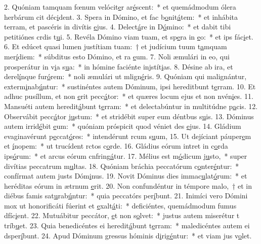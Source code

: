 2. Quóniam tamquam fœnum velócit\uline{e}r ar\uline{é}scent:~* et quemádmodum ólera herbárum cit déc\uline{i}dent.
3. Spera in Dómino, et fac b\uline{o}nit\uline{á}tem:~* et inhábita terram, et pascéris in divítis \uline{e}jus.
4. Delect\uline{á}re in D\uline{ó}mino:~* et dabit tibi petitiónes crdis t\uline{u}i.
5. Revéla Dómino viam tuam, et sp\uline{e}ra in \uline{e}o:~* et ips fác\uline{i}et.
6. Et edúcet quasi lumen justítiam tuam:~† et judícium tuum t\uline{a}mquam mer\uline{í}diem:~* súbditus esto Dómino, et ra \uline{e}um.
7. Noli æmulári in eo, qui prosperátur in v\uline{i}a s\uline{u}a:~* in hómine faciénte injstít\uline{i}as.
8. Désine ab ira, et derel\uline{í}nque fur\uline{ó}rem:~* noli æmulári ut mlign\uline{é}ris.
9. Quóniam qui malignántur, exterm\uline{i}nab\uline{ú}ntur:~* sustinéntes autem Dóminum, ipsi hereditbunt t\uline{e}rram.
10. Et adhuc pusíllum, et non \uline{e}rit pecc\uline{á}tor:~* et quæres locum ejus et non nvén\uline{i}es.
11. Mansuéti autem heredit\uline{á}bunt t\uline{e}rram:~* et delectabúntur in multitúdne p\uline{a}cis.
12. Observábit pecc\uline{á}tor j\uline{u}stum:~* et stridébit super eum déntbus s\uline{u}is.
13. Dóminus autem irrid\uline{é}bit \uline{e}um:~* quóniam próspicit quod véniet des \uline{e}jus.
14. Gládium evaginavérunt p\uline{e}ccat\uline{ó}res:~* intendérunt rcum s\uline{u}um,
15. Ut dejíciant páuper\uline{e}m et \uline{í}nopem:~* ut trucídent rctos c\uline{o}rde.
16. Gládius eórum intret in c\uline{o}rda ips\uline{ó}rum:~* et arcus eórum cnfring\uline{á}tur.
17. Mélius est m\uline{ó}dicum j\uline{u}sto,~* super divítias peccatrum m\uline{u}ltas.
18. Quóniam bráchia peccatórum c\uline{o}nter\uline{é}ntur:~* confírmat autem justs Dóm\uline{i}nus.
19. Novit Dóminus dies immac\uline{u}lat\uline{ó}rum:~* et heréditas eórum in ætrnum \uline{e}rit.
20. Non confundéntur in témpore malo,~† et in diébus famis sat\uline{u}rab\uline{ú}ntur:~* quia peccatórs per\uline{í}bunt.
21. Inimíci vero Dómini mox ut honorificáti fúerint et \uline{e}xalt\uline{á}ti:~* deficiéntes, quemádmodum fumus dfíc\uline{i}ent.
22. Mutuábitur peccátor, \uline{e}t non s\uline{o}lvet:~* justus autem miserétur t tríb\uline{u}et.
23. Quia benedicéntes ei heredit\uline{á}bunt t\uline{e}rram:~* maledicéntes autem ei dsper\uline{í}bunt.
24. Apud Dóminum gressus hóminis d\uline{i}rig\uline{é}ntur:~* et viam jus v\uline{o}let.
